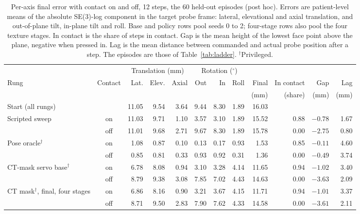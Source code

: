 
\begin{table}[tbp]
\renewcommand{\baselinestretch}{1}\scriptsize
\caption{Per-axis final error with contact on and off, 12 steps, the 60 held-out episodes (post hoc). Errors are patient-level means of the absolute SE(3)-log component in the target probe frame: lateral, elevational and axial translation, and out-of-plane tilt, in-plane tilt and roll. Base and policy rows pool seeds 0 to 2; four-stage rows also pool the four texture stages. In contact is the share of steps in contact. Gap is the mean height of the lowest face point above the plane, negative when pressed in. Lag is the mean distance between commanded and actual probe position after a step. The episodes are those of Table~\ref{tab:ladder}. $^{\dagger}$Privileged.}
\label{tab:posthoc-axes}
\centering
\setlength{\tabcolsep}{2.5pt}
\begin{tabular}{@{}l c rrr rrr r r r r@{}}
\toprule
 & & \multicolumn{3}{c}{Translation (mm)} & \multicolumn{3}{c}{Rotation ($^{\circ}$)} & & & & \\
\cmidrule(lr){3-5}\cmidrule(lr){6-8}
Rung & Contact & Lat. & Elev. & Axial & Out & In & Roll & Final & In contact & Gap & Lag \\
 & & & & & & & & (mm) & (share) & (mm) & (mm) \\
\midrule
Start (all rungs) & & 11.05 & 9.54 & 3.64 & 9.44 & 8.30 & 1.89 & 16.03 & & & \\
Scripted sweep & on & 11.03 & 9.71 & 1.10 & 3.57 & 3.10 & 1.89 & 15.52 & 0.88 & $-0.78$ & 1.67 \\
 & off & 11.01 & 9.68 & 2.71 & 9.67 & 8.30 & 1.89 & 15.78 & 0.00 & $-2.75$ & 0.80 \\
\addlinespace[2pt]
Pose oracle$^{\dagger}$ & on & 1.08 & 0.87 & 0.10 & 0.13 & 0.17 & 0.93 & 1.53 & 0.85 & $-0.11$ & 4.60 \\
 & off & 0.85 & 0.81 & 0.33 & 0.93 & 0.92 & 0.31 & 1.36 & 0.00 & $-0.49$ & 3.74 \\
\addlinespace[2pt]
CT-mask servo base$^{\dagger}$ & on & 6.78 & 8.08 & 0.94 & 3.10 & 3.28 & 4.14 & 11.65 & 0.94 & $-1.02$ & 3.40 \\
 & off & 8.79 & 9.38 & 3.08 & 7.85 & 7.02 & 4.43 & 14.63 & 0.00 & $-3.63$ & 2.09 \\
\addlinespace[2pt]
CT mask$^{\dagger}$, final, four stages & on & 6.86 & 8.16 & 0.90 & 3.21 & 3.67 & 4.15 & 11.71 & 0.94 & $-1.01$ & 3.37 \\
 & off & 8.71 & 9.50 & 2.83 & 7.90 & 7.62 & 4.33 & 14.58 & 0.00 & $-3.61$ & 2.11 \\

\end{tabular}
\end{table}
